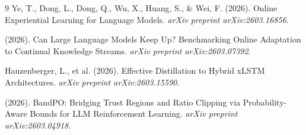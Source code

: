 \documentclass[11pt]{article}
\begin{document}
\begin{thebibliography}{9}
 Ye, T., Dong, L., Dong, Q., Wu, X., Huang, S., \& Wei, F. (2026). Online Experiential Learning for Language Models. \textit{arXiv preprint arXiv:2603.16856}.

 (2026). Can Large Language Models Keep Up? Benchmarking Online Adaptation to Continual Knowledge Streams. \textit{arXiv preprint arXiv:2603.07392}.

 Hauzenberger, L., et al. (2026). Effective Distillation to Hybrid xLSTM Architectures. \textit{arXiv preprint arXiv:2603.15590}.

 (2026). BandPO: Bridging Trust Regions and Ratio Clipping via Probability-Aware Bounds for LLM Reinforcement Learning. \textit{arXiv preprint arXiv:2603.04918}.
\end{thebibliography}
\end{document}
